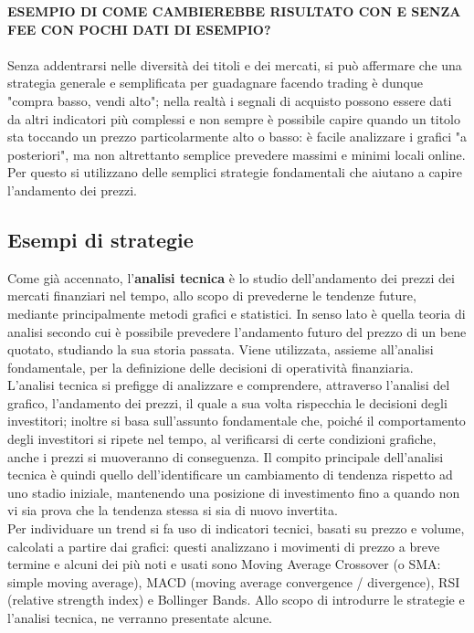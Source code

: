 \documentclass{article}
\numberwithin{equation}{section}
\begin{document}
		
		
		
		
		
		
		
		\textbf{ESEMPIO DI COME CAMBIEREBBE RISULTATO CON E SENZA FEE CON POCHI DATI DI ESEMPIO?}
		\\~\\
		
		
		
		
		
		
		
		
		
		
		Senza addentrarsi nelle diversità dei titoli e dei mercati, si può affermare che una strategia generale e semplificata per guadagnare facendo trading è dunque "compra basso, vendi alto"; nella realtà i segnali di acquisto possono essere dati da altri indicatori più complessi e non sempre è possibile capire quando un titolo sta toccando un prezzo particolarmente alto o basso: è facile analizzare i grafici "a posteriori", ma non altrettanto semplice prevedere massimi e minimi locali online. Per questo si utilizzano delle semplici strategie fondamentali che aiutano a capire l'andamento dei prezzi.
		
		
	\subsection{Esempi di strategie}
		Come già accennato, l'\textbf{analisi tecnica} è lo studio dell'andamento dei prezzi dei mercati finanziari nel tempo, allo scopo di prevederne le tendenze future, mediante principalmente metodi grafici e statistici. In senso lato è quella teoria di analisi secondo cui è possibile prevedere l'andamento futuro del prezzo di un bene quotato, studiando la sua storia passata. Viene utilizzata, assieme all'analisi fondamentale, per la definizione delle decisioni di operatività finanziaria.\\
		L'analisi tecnica si prefigge di analizzare e comprendere, attraverso l'analisi del grafico, l'andamento dei prezzi, il quale a sua volta rispecchia le decisioni degli investitori; inoltre si basa sull'assunto fondamentale che, poiché il comportamento degli investitori si ripete nel tempo, al verificarsi di certe condizioni grafiche, anche i prezzi si muoveranno di conseguenza. Il compito principale dell'analisi tecnica è quindi quello dell'identificare un cambiamento di tendenza rispetto ad uno stadio iniziale, mantenendo una posizione di investimento fino a quando non vi sia prova che la tendenza stessa si sia di nuovo invertita.\\
		Per individuare un trend si fa uso di indicatori tecnici, basati su prezzo e volume, calcolati a partire dai grafici: questi analizzano i movimenti di prezzo a breve termine e alcuni dei più noti e usati sono Moving Average Crossover (o SMA: simple moving average), MACD (moving average convergence / divergence), RSI (relative strength index) e Bollinger Bands. Allo scopo di introdurre le strategie e l'analisi tecnica, ne verranno presentate alcune.
		\\~\\
\end{document}
